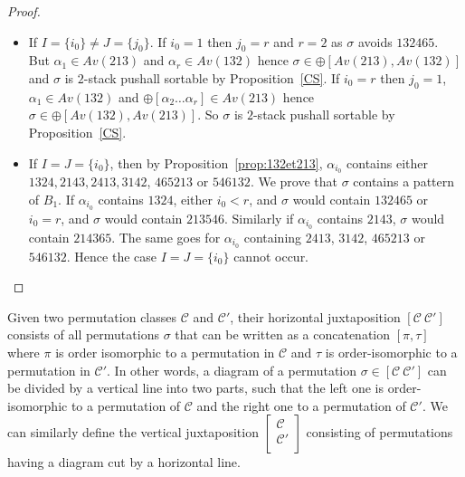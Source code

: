 \documentclass[11pt]{article}
\newcommand{\pushall}{$2$-stack pushall sortable\xspace}
\begin{document}
\begin{proof}
\begin{itemize}
\item If $I = \{ i_0\} \neq J = \{ j_0\}$.
If $i_0 = 1$ then $j_0 = r$ and $r = 2$ as $\sigma$ avoids $132465$. 
But $\alpha_1 \in Av(213)$ and $\alpha_r \in Av(132)$ hence $\sigma \in \oplus[Av(213), Av(132)]$ and $\sigma$ is \pushall by Proposition~\ref{CS}.
If $i_0 = r$ then $j_0 = 1$, $\alpha_1 \in Av(132)$ and $\oplus[\alpha_2 \dots \alpha_r] \in Av(213)$ hence $\sigma \in \oplus[Av(132), Av(213)]$. 
So $\sigma$ is \pushall by Proposition~\ref{CS}.

\item If $I = J = \{ i_0\}$, then by Proposition~\ref{prop:132et213}, $\alpha_{i_0}$ contains either $1324, 2143, 2413, 3142$, $465213$ or $546132$. 
We prove that $\sigma$ contains a pattern of $B_1$. 
If $\alpha_{i_0}$ contains $1324$, either $i_0 < r$, and $\sigma$ would contain $132465$ or $i_0 = r$, and $\sigma$ would contain $213546$. 
Similarly if $\alpha_{i_0}$ contains $2143$, $\sigma$ would contain $214365$. 
The same goes for $\alpha_{i_0}$ containing $2413$, $3142$, $465213$ or $546132$. 
Hence the case $I = J = \{ i_0\}$ cannot occur.
\end{itemize}
\end{proof}


Given two permutation classes ${\mathcal C}$ and ${\mathcal C'}$, their horizontal juxtaposition  $[{\mathcal C}\ {\mathcal C'}]$ consists of all permutations $\sigma$ that can be written as a concatenation $[\pi, \tau]$ 
where $\pi$ is order isomorphic to a permutation in ${\mathcal C}$ and $\tau$ is order-isomorphic to a permutation in ${\mathcal C'}$. 
In other words, a diagram of a permutation $\sigma \in [{\mathcal C}\ {\mathcal C'}]$ can be divided by  a vertical line into two parts, 
such that the left one is order-isomorphic to a permutation of ${\mathcal C}$ and the right one to a permutation of ${\mathcal C'}$. 
We can similarly define the vertical juxtaposition  $ \left[
\begin{array}{l}
{\mathcal C} \\
{\mathcal C'} \\
\end{array}
\right]$ consisting of permutations having a diagram cut by a horizontal line.
\end{document}
